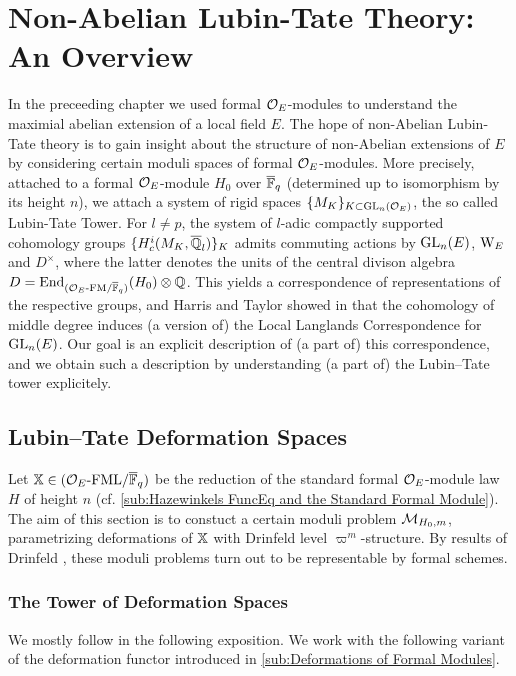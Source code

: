 \documentclass[../main.tex]{subfiles}
\begin{document}
\section{Non-Abelian Lubin-Tate Theory: An Overview} %
\label{sec:Non-Abelian Lubin-Tate Theory: An Overview}
In the preceeding chapter we used formal $\mathcal{O}_E$-modules to understand the 
maximial abelian extension of a local field $E$. The hope of non-Abelian Lubin-Tate
theory is to gain insight about the structure of non-Abelian extensions of $E$
by considering certain moduli spaces of formal $\mathcal{O}_E$-modules.
More precisely, attached to a formal $\mathcal{O}_E$-module $H_0$ over ${\overline {\mathbb{F}}_q}$
(determined
up to isomorphism by its height $n$), we attach a system of rigid spaces 
$\{M_K\}_{K \subset \operatorname{GL}_n(\mathcal{O}_E)}$, the so called Lubin-Tate Tower. For $l \neq p$, 
the system of $l$-adic compactly supported cohomology groups $\{H_c^{i}(M_K,
\overline {\mathbb{Q}}_l)\}_K$ admits commuting actions by $\operatorname{GL}_n(E)$, $\mathrm W_E$ and $D^\times$,
where the latter denotes the units of the central divison algebra $D =
\operatorname{End}_{{({\mathcal{O}_E}\text-\allowbreak\mathrm{FM}/{{\overline {\mathbb{F}}_q}})}}(H_0) \otimes \mathbb{Q}$. This yields a correspondence of 
representations of the respective groups, and Harris and Taylor showed in
\cite{HTShimura} that the cohomology of middle degree induces (a version of)
the Local Langlands Correspondence for $\operatorname{GL}_n(E)$. Our goal is an explicit
description of (a part of) this correspondence, and we obtain such a
description by understanding (a part of) the Lubin--Tate tower explicitely.

\subsection{Lubin--Tate Deformation Spaces} %
\label{sub:Lubin-Tate Deformation Spaces}
Let $\mathbb{X} \in {({\mathcal{O}_E}\text-\allowbreak\mathrm{FML}/{{\overline{\mathbb{F}}_q}})}$ be the reduction of the standard formal
$\mathcal{O}_E$-module law $H$ of height $n$ (cf. \cref{sub:Hazewinkels FuncEq and the
Standard Formal Module}).
The aim of this section is to constuct a certain moduli problem $\mathcal{M}_{H_0, m}$,
parametrizing deformations of $\mathbb{X}$ with Drinfeld level $\varpi^m$-structure.
By results of Drinfeld \cite{drinfel1974elliptic}, these moduli problems turn
out to be representable by formal schemes.

\subsubsection{The Tower of Deformation Spaces} %
\label{ssub:The Tower of Deformation Spaces}
We mostly follow \cite[Chapter 2]{Strauch2008DefSp} in the following
exposition. 
 We work with the following variant of the deformation 
functor introduced in \cref{sub:Deformations of Formal Modules}.
\end{document}
